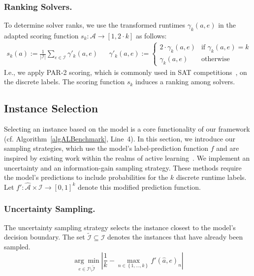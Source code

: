 \documentclass[runningheads]{llncs}
\begin{document}
\subsubsection{Ranking Solvers.}

To determine solver ranks, we use the transformed runtimes $\gamma_k(a, e)$ in the adapted scoring function $s_k : \mathcal{A} \rightarrow [1, 2 \cdot k]$ as follows:
%
\begin{align}
  s_k(a) := \frac{1}{|\mathcal{I}|} \sum_{e \in \mathcal{I}} \gamma'_k(a, e)
  &&
  \gamma'_k(a, e) := \begin{cases}
    2 \cdot \gamma_k(a, e)   & \text{if } \gamma_k(a, e) = k\\
  \gamma_k(a, e)  & \text{otherwise}
  \end{cases}
  \label{eq:rankingeq}
\end{align}
%
I.e., we apply PAR-2 scoring, which is commonly used in SAT competitions~\cite{FroleyksHIJS21}, on the discrete labels.
The scoring function $s_k$ induces a ranking among solvers.


\subsection{Instance Selection}
\label{sec:main:selection}

Selecting an instance based on the model is a core functionality of our framework (cf. Algorithm~\ref{algALBenchmark}, Line~4).
In this section, we introduce our sampling strategies, which use the model's label-prediction function $f$ and are inspired by existing work within the realms of active learning~\cite{settles2009active}.
We implement an uncertainty and an information-gain sampling strategy.
These methods require the model's predictions to include probabilities for the $k$ discrete runtime labels.
Let \mbox{$f' : \mathcal{\hat A} \times \mathcal{I} \rightarrow \left[0, 1\right]^k$} denote this modified prediction function.

\subsubsection{Uncertainty Sampling.}

The uncertainty sampling strategy selects the instance closest to the model's decision boundary.
The set $\tilde{\mathcal{I}} \subseteq \mathcal{I}$ denotes the instances that have already been sampled.
%
\begin{equation*}
  \underset{e \in \mathcal{I} \setminus \tilde{\mathcal{I}}}{\arg\min} \left\lvert \frac{1}{k} - \max_{n \in \left\lbrace 1, \dots, k \right\rbrace} f'\!\left(\hat{a}, e\right)_{n} \right\rvert
\end{equation*}
\end{document}
